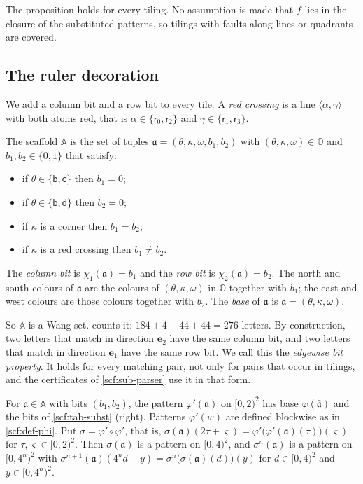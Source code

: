 The proposition holds for every tiling. No assumption is made that $f$ lies in the closure of the substituted patterns, so tilings with faults along lines or quadrants are covered.

\subsection{The ruler decoration}\label{scf:sub-ruler}

We add a column bit and a row bit to every tile. A \emph{red crossing} is a line $\langle\alpha,\gamma\rangle$ with both atoms red, that is $\alpha\in\{\mathsf r_0,\mathsf r_2\}$ and $\gamma\in\{\mathsf r_1,\mathsf r_3\}$.

\begin{definition}\label{scf:def-ruler}
The scaffold $\mathbb A$ is the set of tuples $\mathfrak a=(\theta,\kappa,\omega,b_1,b_2)$ with $(\theta,\kappa,\omega)\in\mathbb O$ and $b_1,b_2\in\{0,1\}$ that satisfy:
\begin{itemize}
\item[(R1)] if $\theta\in\{\mathsf b,\mathsf c\}$ then $b_1=0$;
\item[(R2)] if $\theta\in\{\mathsf b,\mathsf d\}$ then $b_2=0$;
\item[(R3)] if $\kappa$ is a corner then $b_1=b_2$;
\item[(R4)] if $\kappa$ is a red crossing then $b_1\ne b_2$.
\end{itemize}
The \emph{column bit} is $\chi_1(\mathfrak a)=b_1$ and the \emph{row bit} is $\chi_2(\mathfrak a)=b_2$. The north and south colours of $\mathfrak a$ are the colours of $(\theta,\kappa,\omega)$ in $\mathbb O$ together with $b_1$; the east and west colours are those colours together with $b_2$. The \emph{base} of $\mathfrak a$ is $\bar{\mathfrak a}=(\theta,\kappa,\omega)$.
\end{definition}

So $\mathbb A$ is a Wang set.  counts it: $184+4+44+44=276$ letters. By construction, two letters that match in direction $\mathbf e_2$ have the same column bit, and two letters that match in direction $\mathbf e_1$ have the same row bit. We call this the \emph{edgewise bit property}. It holds for every matching pair, not only for pairs that occur in tilings, and the certificates of \cref{scf:sub-parser} use it in that form.

\begin{definition}\label{scf:def-phiprime}
For $\mathfrak a\in\mathbb A$ with bits $(b_1,b_2)$, the pattern $\varphi'(\mathfrak a)$ on $[0,2)^2$ has base $\varphi(\bar{\mathfrak a})$ and the bits of \cref{scf:tab-subst} (right). Patterns $\varphi'(w)$ are defined blockwise as in \cref{scf:def-phi}. Put $\sigma=\varphi'\circ\varphi'$, that is, $\sigma(\mathfrak a)(2\tau+\varsigma)=\varphi'\bigl(\varphi'(\mathfrak a)(\tau)\bigr)(\varsigma)$ for $\tau,\varsigma\in[0,2)^2$. Then $\sigma(\mathfrak a)$ is a pattern on $[0,4)^2$, and $\sigma^n(\mathfrak a)$ is a pattern on $[0,4^n)^2$ with $\sigma^{n+1}(\mathfrak a)(4^n d+y)=\sigma^n\bigl(\sigma(\mathfrak a)(d)\bigr)(y)$ for $d\in[0,4)^2$ and $y\in[0,4^n)^2$.
\end{definition}

